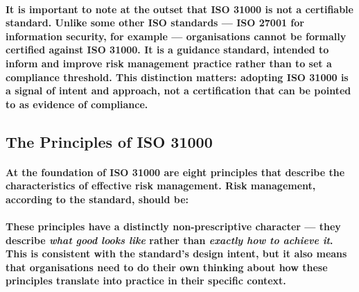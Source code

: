 \paragraph{It is important to note at the outset that \textbf{ISO 31000 is not a certifiable standard}. Unlike some other ISO standards — ISO 27001 for information security, for example — organisations cannot be formally certified against ISO 31000. It is a guidance standard, intended to inform and improve risk management practice rather than to set a compliance threshold. This distinction matters: adopting ISO 31000 is a signal of intent and approach, not a certification that can be pointed to as evidence of compliance.}
\subsection{The Principles of ISO 31000}
\paragraph{At the foundation of ISO 31000 are eight principles that describe the characteristics of effective risk management. Risk management, according to the standard, should be:}
\begin{itemize}
\end{itemize}
\paragraph{These principles have a distinctly non-prescriptive character — they describe \textit{what good looks like} rather than \textit{exactly how to achieve it}. This is consistent with the standard's design intent, but it also means that organisations need to do their own thinking about how these principles translate into practice in their specific context.}
